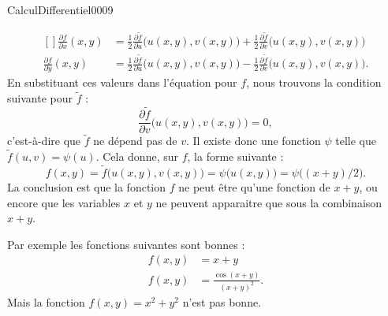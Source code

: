 \begin{corrige}{CalculDifferentiel0009}
\begin{description}
			\begin{equation}
				\begin{aligned}[]
					\frac{ \partial f }{ \partial x }(x,y)&=\frac{ 1 }{2}\frac{ \partial \tilde f }{ \partial u }\big( u(x,y),v(x,y) \big)+\frac{ 1 }{2}\frac{ \partial \tilde f }{ \partial v }\big( u(x,y),v(x,y) \big)\\
					\frac{ \partial f }{ \partial y }(x,y)&=\frac{ 1 }{2}\frac{ \partial \tilde f }{ \partial u }\big( u(x,y),v(x,y) \big)-\frac{ 1 }{2}\frac{ \partial \tilde f }{ \partial v }\big( u(x,y),v(x,y) \big).
				\end{aligned}
			\end{equation}
			En substituant ces valeurs dans l'équation pour $f$, nous trouvons la condition suivante pour $\tilde f$ :
			\begin{equation}
				\frac{ \partial \tilde f }{ \partial v }\big( u(x,y),v(x,y) \big)=0,
			\end{equation}
			c'est-à-dire que $\tilde f$ ne dépend pas de $v$. Il existe donc une fonction $\psi$ telle que $\tilde f(u,v)=\psi(u)$. Cela donne, sur $f$, la forme suivante :
			\begin{equation}
				f(x,y)=\tilde f\big( u(x,y),v(x,y) \big)=\psi\big( u(x,y) \big)=\psi\big( (x+y)/2 \big).
			\end{equation}
			La conclusion est que la fonction $f$ ne peut être qu'une fonction de $x+y$, ou encore que les variables $x$ et $y$ ne peuvent apparaitre que sous la combinaison $x+y$.

			Par exemple les fonctions suivantes sont bonnes :
			\begin{subequations}
				\begin{align}
					f(x,y)&=x+y\\
					f(x,y)&=\frac{ \cos(x+y) }{ (x+y)^2 }.
				\end{align}
			\end{subequations}
			Mais la fonction $f(x,y)=x^2+y^2$ n'est pas bonne.
	\end{description}
	

\end{corrige}
